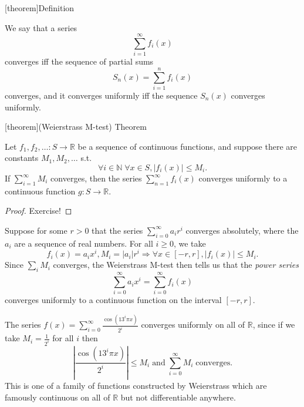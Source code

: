\documentclass[12pt]{report}
\theoremstyle{definition}
\begin{document}
[theorem]{Definition}
\begin{function series convergence}
    We say that a series \[
        \sum_{i=1}^{\infty} f_i(x)
    \]converges iff the sequence of partial sums\[
        S_n(x)=\sum_{i=1}^{n} f_i(x)
    \]converges, and it converges uniformly iff the sequence $S_n(x)$
    converges uniformly.
\end{function series convergence}

[theorem]{(Weierstrass M-test) Theorem}
\begin{Weierstrass M-test}
    Let $f_1,f_2,\ldots:S\rightarrow\mathbb{R}$ be a sequence of continuous
    functions, and suppose there are constants $M_1,M_2,\ldots$ s.t.\[
        \forall i\in\mathbb{N} \;\forall x\in S, |f_i(x)|\le M_i.
    \]If $\sum_{i=1}^{\infty} M_i$ converges, then the series
    $\sum_{n=1}^{\infty} f_i(x)$ converges uniformly to a continuous function
    $g:S\rightarrow\mathbb{R}$.
\end{Weierstrass M-test}

\begin{proof}
    Exercise!
\end{proof} 

\begin{ex}
    Suppose for some $r>0$ that the series $\sum_{i=0}^{\infty} a_i r^{i}$
    converges absolutely, where the $a_i$ are a sequence of real numbers.
    For all $i\ge 0$, we take \[
        f_i(x) = a_i x^{i}, M_i = |a_i|r^{i} \Longrightarrow
        \forall x\in[-r,r], |f_i(x)|\le M_i.
    \]
    Since $\sum_{i}^{} M_i$ converges, the Weierstrass M-test then tells us that
    the \emph{power series} \[
        \sum_{i=0}^{\infty} a_i x^{i} = \sum_{i=0}^{\infty} f_i(x)
    \]converges uniformly to a continuous function on the interval $[-r,r]$.
\end{ex} 

\begin{ex}
    The series $f(x)=\sum_{i=0}^{\infty} \frac{\cos{(13^{i}\pi x)}}{2^{i}}$
    converges uniformly on all of $\mathbb{R}$,
    since if we take $M_i = \frac{1}{2^{i}}$ for all $i$ then\[
        \left|\frac{\cos{(13^{i}\pi x)}}{2^{i}}\right|\le M_i
        \;\text{and}\; \sum_{i=0}^{\infty} M_i \;\text{converges.}
    \]
    This is one of a family of functions constructed by Weierstrass which
    are famously continuous on all of $\mathbb{R}$ but not differentiable
    anywhere.
\end{ex} 
\end{document}
